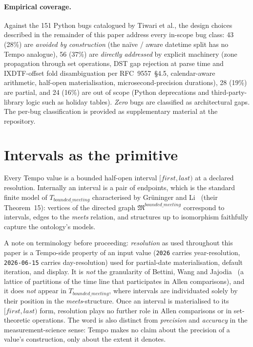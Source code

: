 \paragraph*{Empirical coverage.} Against the 151 Python bugs
catalogued by Tiwari et al., the design choices described in the
remainder of this paper address every in-scope bug class: 43 (28\%)
are \emph{avoided by construction} (the na\"ive / aware datetime
split has no Tempo analogue), 56 (37\%) are \emph{directly addressed}
by explicit machinery (zone propagation through set operations, DST
gap rejection at parse time and IXDTF-offset fold disambiguation per
RFC~9557~\S 4.5, calendar-aware arithmetic, half-open materialisation,
microsecond-precision durations), 28 (19\%) are partial, and 24
(16\%) are out of scope (Python deprecations and third-party-library
logic such as holiday tables). \emph{Zero} bugs are classified as
architectural gaps. The per-bug classification is provided as
supplementary material at the repository.

\section{Intervals as the primitive}

Every Tempo value is a bounded half-open interval $[\mathit{first},
\mathit{last})$ at a declared resolution. Internally an interval is
a pair of endpoints, which is the standard finite model of
$T_{bounded\_meeting}$ characterised by Gr\"uninger and
Li~\cite{gruninger2017allenontology} (their Theorem~15): vertices of
the directed graph $\mathfrak{M}^{bounded\_meeting}$ correspond to
intervals, edges to the \textit{meets} relation, and structures up to
isomorphism faithfully capture the ontology's models.

A note on terminology before proceeding: \emph{resolution} as used
throughout this paper is a Tempo-side property of an input value
(\texttt{2026} carries year-resolution, \texttt{2026-06-15} carries
day-resolution) used for partial-date materialisation, default
iteration, and display. It is \emph{not} the granularity of
Bettini, Wang and Jajodia~\cite{bettini-granularities} (a lattice
of partitions of the time line that participates in Allen
comparisons), and it does \emph{not} appear in
$T_{bounded\_meeting}$, where intervals are individuated solely by
their position in the \textit{meets}-structure. Once an interval is
materialised to its $[\mathit{first}, \mathit{last})$ form,
resolution plays no further role in Allen comparisons or in
set-theoretic operations. The word is also distinct from
\emph{precision} and \emph{accuracy} in the measurement-science
sense: Tempo makes no claim about the precision of a value's
construction, only about the extent it denotes.

